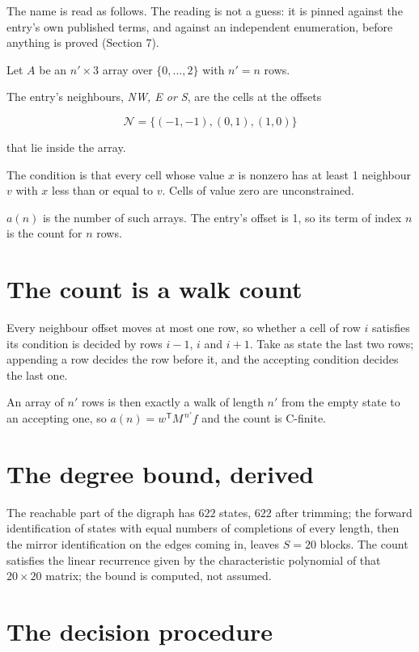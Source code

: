 \documentclass[11pt]{article}
\theoremstyle{definition}
\begin{document}
The name is read as follows. The reading is not a guess: it is pinned against the entry's own published terms, and against an independent enumeration, before anything is proved (Section 7).

Let $A$ be an $n' \times 3$ array over $\{0,\dots,2\}$ with $n' = n$ rows.

The entry's neighbours, {\itshape NW, E or S}, are the cells at the offsets

\[\mathcal{N} = \{(-1,-1), (0,1), (1,0)\}\]

that lie inside the array.

The condition is that every cell whose value $x$ is nonzero has at least 1 neighbour $v$ with $x$ less than or equal to $v$. Cells of value zero are unconstrained.

$a(n)$ is the number of such arrays. The entry's offset is 1, so its term of index $n$ is the count for $n$ rows.

\section{The count is a walk count}

Every neighbour offset moves at most one row, so whether a cell of row $i$ satisfies its condition is decided by rows $i-1$, $i$ and $i+1$. Take as state the last two rows; appending a row decides the row before it, and the accepting condition decides the last one.

An array of $n'$ rows is then exactly a walk of length $n'$ from the empty state to an accepting one, so $a(n) = w^{\mathsf T}M^{\,n'}f$ and the count is C-finite.

\section{The degree bound, derived}

The reachable part of the digraph has $622$ states, $622$ after trimming; the forward identification of states with equal numbers of completions of every length, then the mirror identification on the edges coming in, leaves $S = 20$ blocks. The count satisfies the linear recurrence given by the characteristic polynomial of that $20\times20$ matrix; the bound is computed, not assumed.

\section{The decision procedure}
\end{document}
